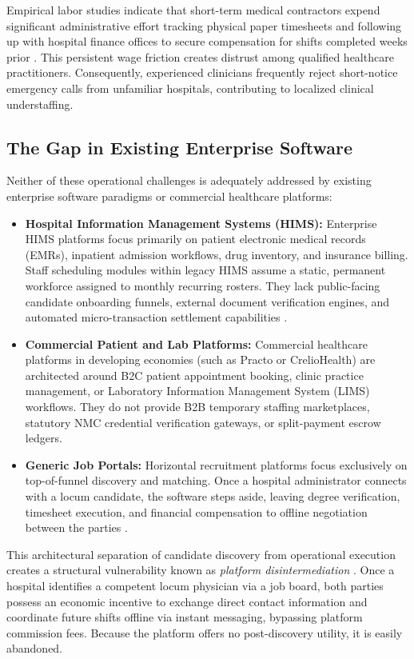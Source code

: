 \documentclass[conference]{IEEEtran}
\begin{document}
Empirical labor studies indicate that short-term medical contractors expend significant administrative effort tracking physical paper timesheets and following up with hospital finance offices to secure compensation for shifts completed weeks prior \cite{currie2019locum}. This persistent wage friction creates distrust among qualified healthcare practitioners. Consequently, experienced clinicians frequently reject short-notice emergency calls from unfamiliar hospitals, contributing to localized clinical understaffing.

\subsection{The Gap in Existing Enterprise Software}
Neither of these operational challenges is adequately addressed by existing enterprise software paradigms or commercial healthcare platforms:
\begin{itemize}
    \item \textbf{Hospital Information Management Systems (HIMS):} Enterprise HIMS platforms focus primarily on patient electronic medical records (EMRs), inpatient admission workflows, drug inventory, and insurance billing. Staff scheduling modules within legacy HIMS assume a static, permanent workforce assigned to monthly recurring rosters. They lack public-facing candidate onboarding funnels, external document verification engines, and automated micro-transaction settlement capabilities \cite{motta2003contextual}.
    \item \textbf{Commercial Patient and Lab Platforms:} Commercial healthcare platforms in developing economies (such as Practo or CrelioHealth) are architected around B2C patient appointment booking, clinic practice management, or Laboratory Information Management System (LIMS) workflows. They do not provide B2B temporary staffing marketplaces, statutory NMC credential verification gateways, or split-payment escrow ledgers.
    \item \textbf{Generic Job Portals:} Horizontal recruitment platforms focus exclusively on top-of-funnel discovery and matching. Once a hospital administrator connects with a locum candidate, the software steps aside, leaving degree verification, timesheet execution, and financial compensation to offline negotiation between the parties \cite{einav2016peer}. 
\end{itemize}

This architectural separation of candidate discovery from operational execution creates a structural vulnerability known as \textit{platform disintermediation} \cite{rochet2006two, gu2021trust}. Once a hospital identifies a competent locum physician via a job board, both parties possess an economic incentive to exchange direct contact information and coordinate future shifts offline via instant messaging, bypassing platform commission fees. Because the platform offers no post-discovery utility, it is easily abandoned.
\end{document}
